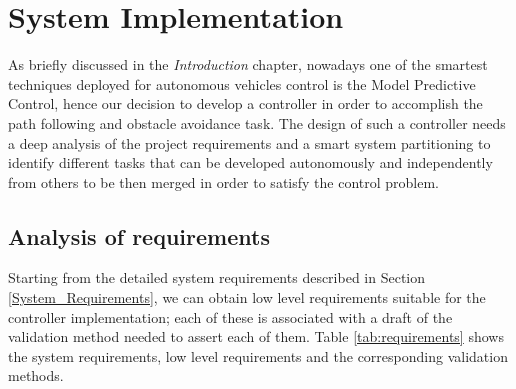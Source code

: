 \section{System Implementation} \label{system_partitioning}
As briefly discussed in the \textit{Introduction} chapter, nowadays one of the smartest techniques deployed for autonomous vehicles control is the Model Predictive Control, hence our decision to develop a controller in order to accomplish the path following and obstacle avoidance task.
The design of such a controller needs a deep analysis of the project requirements and a smart system partitioning to identify different tasks that can be developed autonomously and independently from others to be then merged in order to satisfy the control problem.


\subsection{Analysis of requirements}
Starting from the detailed system requirements described in Section \ref{System_Requirements}, we can obtain low level requirements suitable for the controller implementation; each of these is associated with a draft of the validation method needed to assert each of them. Table \ref{tab:requirements} shows the system requirements, low level requirements and the corresponding validation methods.

